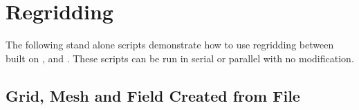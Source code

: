\documentclass[letterpaper,10pt,english]{sphinxmanual}
\begin{document}
\section{Regridding}
\label{\detokenize{examples:regridding}}
The following stand alone scripts demonstrate how to use regridding between
{\hyperref[\detokenize{field:ESMF.api.field.Field}]{}} built on
{\hyperref[\detokenize{grid:ESMF.api.grid.Grid}]{}}, {\hyperref[\detokenize{mesh:ESMF.api.mesh.Mesh}]{}}
and {\hyperref[\detokenize{locstream:ESMF.api.locstream.LocStream}]{}}. These scripts
can be run in serial or parallel with no modification.


\subsection{Grid, Mesh and Field Created from File}
\end{document}
